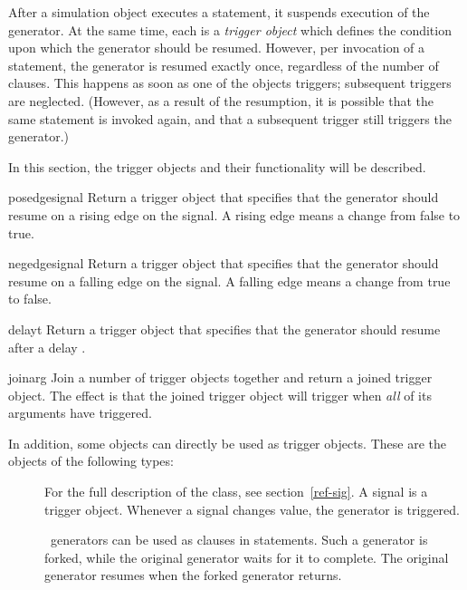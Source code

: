 \hspace{\leftmargin} 

After a simulation object executes a  statement, it
suspends execution of the generator. At the same time, each
 is a \emph{trigger object} which defines the condition
upon which the generator should be resumed. However, per invocation of a
 statement, the generator is resumed exactly once,
regardless of the number of clauses. This happens as soon as one
of the objects triggers; subsequent triggers are
neglected. (However, as a result of the resumption, it is possible
that the same  statement is invoked again, and that a
subsequent trigger still triggers the generator.)

In this section, the trigger objects and their functionality will be
described. 

\begin{funcdesc}{posedge}{signal}
Return a trigger object that specifies that the generator should
resume on a rising edge on the signal. A rising edge means a change
from false to true.
\end{funcdesc}

\begin{funcdesc}{negedge}{signal}
Return a trigger object that specifies that the generator should
resume on a falling edge on the signal. A falling edge means a change
from true to false.
\end{funcdesc}

\begin{funcdesc}{delay}{t}
Return a trigger object that specifies that the generator should
resume after a delay .
\end{funcdesc}

\begin{funcdesc}{join}{arg }
Join a number of trigger objects together and return a joined
trigger object.  The effect is that the joined trigger object will
trigger when \emph{all} of its arguments have triggered.
\end{funcdesc}

In addition, some objects can directly be used as trigger
objects. These are the objects of the following types:

\begin{description}
\item[]
For the full description of the  class, see
section~\ref{ref-sig}.
A signal is a trigger object. Whenever a signal changes value, the
generator is triggered.

\item[]
\myhdl\ generators can be used as clauses in 
statements. Such a generator is forked, while the original generator
waits for it to complete. The original generator resumes when the
forked generator returns.
\end{description}


